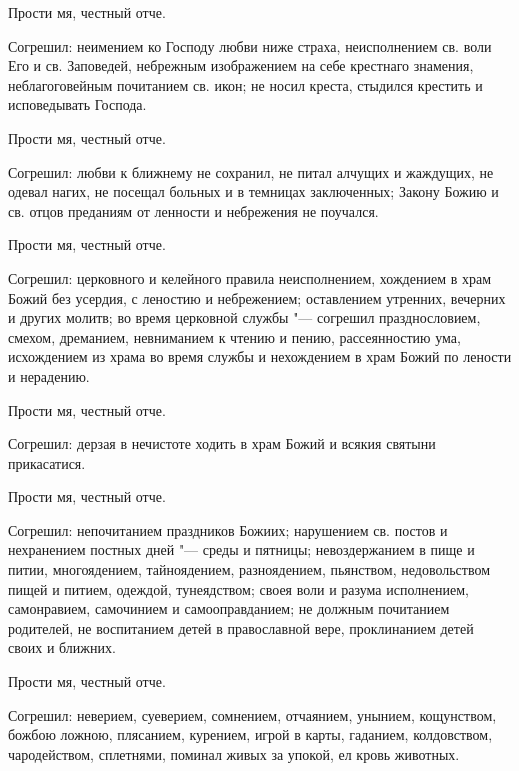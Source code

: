 Прости мя, честный отче. 



Согрешил: неимением ко Господу любви ниже страха, неисполнением св. воли Его и св. Заповедей, небрежным изображением на себе крестнаго знамения, неблагоговейным почитанием св. икон; не носил креста, стыдился крестить и исповедывать Господа. 



Прости мя, честный отче. 



Согрешил: любви к ближнему не сохранил, не питал алчущих и жаждущих, не одевал нагих, не посещал больных и в темницах заключенных; Закону Божию и св. отцов преданиям от ленности и небрежения не поучался. 



Прости мя, честный отче. 



Согрешил: церковного и келейного правила неисполнением, хождением в храм Божий без усердия, с леностию и небрежением; оставлением утренних, вечерних и других молитв; во время церковной службы "--- согрешил празднословием, смехом, дреманием, невниманием к чтению и пению, рассеянностию ума, исхождением из храма во время службы и нехождением в храм Божий по лености и нерадению. 



Прости мя, честный отче. 



Согрешил: дерзая в нечистоте ходить в храм Божий и всякия святыни прикасатися. 



Прости мя, честный отче. 



Согрешил: непочитанием праздников Божиих; нарушением св. постов и нехранением постных дней "--- среды и пятницы; невоздержанием в пище и питии, многоядением, тайноядением, разноядением, пьянством, недовольством пищей и питием, одеждой, тунеядством; своея воли и разума исполнением, самонравием, самочинием и самооправданием; не должным почитанием родителей, не воспитанием детей в православной вере, проклинанием детей своих и ближних. 



Прости мя, честный отче. 



Согрешил: неверием, суеверием, сомнением, отчаянием, унынием, кощунством, божбою ложною, плясанием, курением, игрой в карты, гаданием, колдовством, чародейством, сплетнями, поминал живых за упокой, ел кровь животных. 



